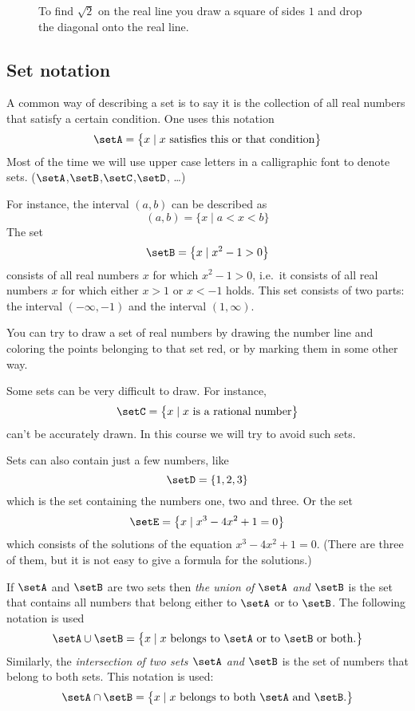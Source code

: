 \begin{figure}[t]\centering
  
  \caption{To find $\sqrt2$ on the real line you draw a square of sides
    $1$ and drop the diagonal onto the real line.}
\end{figure}

\subsection{Set notation}
\label{sec:set-notation}
A common way of describing a set is to say it is the collection of all
real numbers that satisfy a certain condition.  One uses this notation
\[
\setA = \bigl\{ x \mid \text{$x$ satisfies this or that condition}\bigr\}
\]
Most of the time we will use upper case letters in a calligraphic font
to denote sets.  ($\setA$,$\setB$,$\setC$,$\setD$, \dots)

For instance, the interval $(a, b)$ can be described as
\[
(a, b) = \bigl\{x \mid a<x<b\bigr\}
\]
The set 
\[
\setB = \bigl\{x \mid x^2-1>0\bigr\}
\]
consists of all real numbers $x$ for which $x^2-1>0$, i.e.\ it consists of all
real numbers $x$ for which either $x>1$ or $x<-1$ holds.  This set consists of
two parts: the interval $(-\infty, -1)$ and the interval $(1, \infty)$.

You can try to draw a set of real numbers by drawing the number line and
coloring the points belonging to that set red, or by marking them in some other
way.

Some sets can be very difficult to draw.  For instance, 
\[
\setC = \bigl\{x \mid \text{$x$ is a rational number}\bigr\}
\]
can't be accurately drawn.  In this course we will try to avoid such sets.

Sets can also contain just a few numbers, like
\[
\setD = \{1, 2, 3\}
\]
which is the set containing the numbers one, two and three.  Or the set
\[
\setE = \bigl\{x \mid x^3-4x^2+1 = 0\bigr\}
\]
which consists of the solutions of the equation $x^3-4x^2+1=0$.
(There are three of them, but it is not easy to give a formula for the
solutions.)

If $\setA$ and $\setB$ are two sets then \emph{the union of $\setA$ and $\setB$}
is the set that contains all numbers that belong either to $\setA$ or to
$\setB$.  The following notation is used
\[
\setA\cup\setB = \bigl\{x \mid
\text{$x$ belongs to $\setA$ or to $\setB$ or both.}\bigr\}
\]
Similarly, the \emph{intersection of two sets $\setA$ and $\setB$} is the set of
numbers that belong to both sets.  This notation is used:
\[
\setA\cap\setB = \bigl\{x \mid
\text{$x$ belongs to both $\setA$ and $\setB$.}\bigr\}
\]
